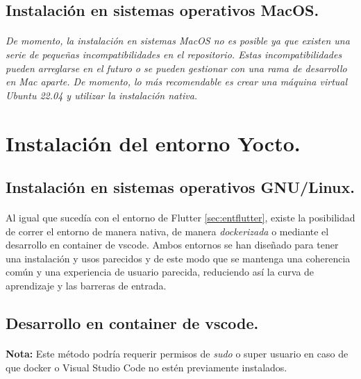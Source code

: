 \subsection{Instalación en sistemas operativos MacOS.}

\paragraph{}\emph{De momento, la instalación en sistemas MacOS no es posible ya que
existen una serie de pequeñas incompatibilidades en el repositorio. Estas
incompatibilidades pueden arreglarse en el futuro o se pueden gestionar con una rama
de desarrollo en Mac aparte. De momento, lo más recomendable es crear una máquina
virtual Ubuntu 22.04 y utilizar la instalación nativa.}

\newpage

\section{Instalación del entorno Yocto.}

\subsection{Instalación en sistemas operativos GNU/Linux.}

\paragraph{}Al igual que sucedía con el entorno de Flutter \ref{sec:entflutter}, existe
la posibilidad de correr el entorno de manera nativa, de manera \emph{dockerizada} o
mediante el desarrollo en container de \gls{vscode}.
Ambos entornos se han diseñado para tener una instalación y usos parecidos y de este modo que
se mantenga una coherencia común y una experiencia de usuario parecida, reduciendo así
la curva de aprendizaje y las barreras de entrada.

\subsection{Desarrollo en container de vscode.}

\paragraph{}\textbf{Nota:} Este método podría requerir permisos de \emph{sudo} o super
usuario en caso de que docker o Visual Studio Code no estén previamente instalados.

